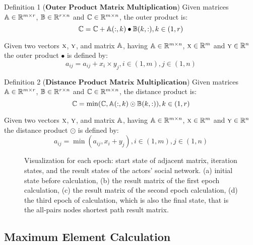 \documentclass[10pt,twocolumn,letterpaper]{article}
\begin{document}
Definition 1 ($\textbf{Outer Product Matrix Multiplication}$) Given matrices \(\Bbb A \in \Bbb R^{m\times r}\), \(\Bbb B \in \Bbb R^{r\times n}\) and \(\Bbb C \in \Bbb R^{m\times n}\), the outer product is:
\begin{equation}
\Bbb C = \Bbb C  + \Bbb A(:,k)\bullet \Bbb B(k,:) , k \in (1,r)
\end{equation}

Given two vectors \(\textsc x\), \(\textsc y\), and matrix \(\Bbb A\), having \(\Bbb A \in \Bbb R^{m\times n}\), \(\textsc x \in \Bbb R^{m}\) and \(\textsc y \in \Bbb R^{n}\) the outer product \(\bullet\) is defined by:
\begin{equation}
a_{ij} = a_{ij} + x_i \times  y_j, i \in (1,m), j \in (1,n)
\end{equation}

Definition 2 ($\textbf{Distance Product Matrix Multiplication}$) Given matrices \(\Bbb A \in \Bbb R^{m\times r}\), \(\Bbb B \in \Bbb R^{r\times n}\) and \(\Bbb C \in \Bbb R^{m\times n}\), the distance product is:
\begin{equation}
  \Bbb C = \min(\Bbb C, \Bbb A(:,k)\odot \Bbb B(k,:)) , k \in (1,r)
\end{equation}

Given two vectors \(\textsc x\), \(\textsc y\), and matrix \(\Bbb A\), having \(\Bbb A \in \Bbb R^{m\times n}\), \(\textsc x \in \Bbb R^{m}\) and \(\textsc y \in \Bbb R^{n}\) the distance product \(\odot\) is defined by:
\begin{equation}
a_{ij} = \min(a_{ij} , x_i + y_j), i \in (1,m), j \in (1,n)
\end{equation}
\begin{figure*}
\begin{center}
\end{center}
   \caption{Visualization for each epoch: start state of adjacent matrix, iteration states, and the result states of the actors' social network.
   (a) initial state before calculation,
   (b) the result matrix of the first epoch calculation,
   (c) the result matrix of the second epoch calculation,
   (d) the third epoch of calculation, which is also the final state, that is the all-pairs nodes shortest path result matrix.}
\label{fig:short}
\end{figure*}


\subsection{Maximum Element Calculation}
\end{document}
